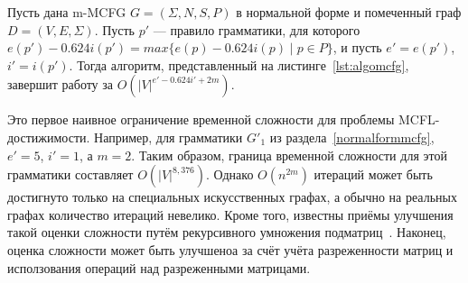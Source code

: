 \begin{theorem}\label{thm:complexity}
	Пусть дана m-MCFG $G = (\Sigma, N, S, P)$ в нормальной форме и помеченный граф $D =(V, E, \Sigma)$. Пусть $p'$ --- правило грамматики, для которого $e(p') - 0.624i(p') = max\{e(p) - 0.624i(p) \mid p\in P\}$, и пусть $e' = e(p')$, $i' = i(p')$. Тогда алгоритм, представленный на листинге~\ref{lst:algomcfg}, завершит работу за $O(|V|^{e' - 0.624i' + 2m})$.
\end{theorem}

Это первое наивное ограничение временной сложности для проблемы MCFL-достижимости. Например, для грамматики $G'_1$ из раздела~\ref{normalformmcfg}, $e' = 5$, $i' = 1$, а $m = 2$. Таким образом, граница временной сложности для этой грамматики составляет $O(|V|^{8,376})$. Однако $O(n^{2m})$ итераций может быть достигнуто только на специальных искусственных графах, а обычно на реальных графах количество итераций невелико. Кроме того, известны приёмы улучшения такой оценки сложности путём рекурсивного умножения подматриц~\cite{Valiant:1975:GCR:1739932.1740048}. Наконец, оценка сложности может быть улучшеноа за счёт учёта разреженности матриц и исползования операций над разреженными матрицами.
